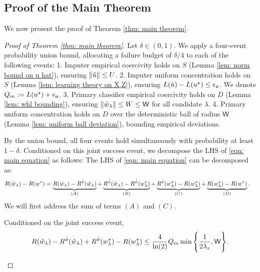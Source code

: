 \subsection{Proof of the Main Theorem}\label{subsec: proof of main theorem}

We now present the proof of Theorem \ref{thm: main theorem}.

\begin{proof}[Proof of Theorem \ref{thm: main theorem}]
    Let $\delta\in(0,1)$. We apply a four-event probability union bound, allocating a failure budget of $\delta/4$ to each of the following events:
    1. Imputer empirical coercivity holds on $S$ (Lemma \ref{lem: norm bound on u hat}), ensuring $\|\hat{u}\| \le U$.
    2. Imputer uniform concentration holds on $S$ (Lemma \ref{lem: learning theory on X,Z}), ensuring $L(\hat{u}) - L(u^\star) \le \epsilon_{\mathfrak{u}}$. We denote $Q_m := L(u^\star) + \epsilon_{\mathfrak{u}}$.
    3. Primary classifier empirical coercivity holds on $D$ (Lemma \ref{lem: whl bounding}), ensuring $\|\hat{w}_\lambda\| \le W \le \mathsf{W}$ for all candidate $\lambda$.
    4. Primary uniform concentration holds on $D$ over the deterministic ball of radius $\mathsf{W}$ (Lemma \ref{lem: uniform ball deviation}), bounding empirical deviations.
    
    By the union bound, all four events hold simultaneously with probability at least $1-\delta$. Conditioned on this joint success event, we decompose the LHS of \eqref{eqn: main equation} as follows:
    The LHS of \eqref{eqn: main equation} can be decomposed as:
    \begin{equation*}
    \begin{aligned}
        R(\hat{w}_\lambda) - R(w^*) &=
        \underbrace{R(\hat{w}_\lambda) - R^{\hat{\phi}}(\hat{w}_\lambda)}_{(A)} +
        \underbrace{R^{\hat{\phi}}(\hat{w}_\lambda) - R^{\hat{\phi}}(w^\star_{\lambda})}_{(B)} +
        \underbrace{R^{\hat{\phi}}(w^\star_{\lambda}) - R(w^\star_{\lambda})}_{(C)} +
        \underbrace{R(w^\star_{\lambda}) - R(w^*)}_{(D)}.
    \end{aligned}
    \end{equation*}
    We will first address the sum of terms $(A)$ and $(C)$.
    \begin{claim}
       Conditioned on the joint success event,
        \begin{equation*}
        \begin{aligned}
            R(\hat{w}_\lambda) - R^{\hat{\phi}}(\hat{w}_\lambda) + R^{\hat{\phi}}(w^\star_{\lambda}) - R(w^\star_{\lambda})
            \leq \frac{4}{\ln(2)} Q_m \min\Bigg\{\frac{1}{2\lambda_z}, \mathsf{W}\Bigg\}.
        \end{aligned}
        \end{equation*}
    \end{claim}


\end{proof}
